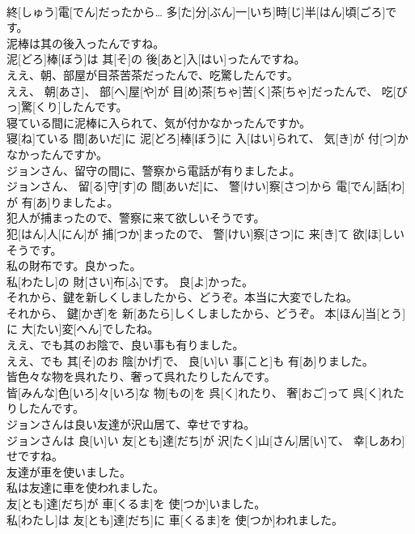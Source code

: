 \documentclass[8pt]{extreport}
\begin{document}
\begin{CJK}{UTF8}{min}
\\	終[しゅう]電[でん]だったから… 多[た]分[ぶん]一[いち]時[じ]半[はん]頃[ごろ]です。
\\	泥棒は其の後入ったんですね。	
\\	泥[どろ]棒[ぼう]は 其[そ]の 後[あと]入[はい]ったんですね。
\\	ええ、朝、部屋が目茶苦茶だったんで、吃驚したんです。	
\\	ええ、 朝[あさ]、 部[へ]屋[や]が 目[め]茶[ちゃ]苦[く]茶[ちゃ]だったんで、 吃[びっ]驚[くり]したんです。
\\	寝ている間に泥棒に入られて、気が付かなかったんですか。	
\\	寝[ね]ている 間[あいだ]に 泥[どろ]棒[ぼう]に 入[はい]られて、 気[き]が 付[つ]かなかったんですか。
\\	ジョンさん、留守の間に、警察から電話が有りましたよ。	
\\	ジョンさん、 留[る]守[す]の 間[あいだ]に、 警[けい]察[さつ]から 電[でん]話[わ]が 有[あ]りましたよ。
\\	犯人が捕まったので、警察に来て欲しいそうです。	
\\	犯[はん]人[にん]が 捕[つか]まったので、 警[けい]察[さつ]に 来[き]て 欲[ほ]しいそうです。
\\	私の財布です。良かった。	
\\	私[わたし]の 財[さい]布[ふ]です。 良[よ]かった。
\\	それから、鍵を新しくしましたから、どうぞ。本当に大変でしたね。	
\\	それから、 鍵[かぎ]を 新[あたら]しくしましたから、どうぞ。 本[ほん]当[とう]に 大[たい]変[へん]でしたね。
\\	ええ、でも其のお陰で、良い事も有りました。	
\\	ええ、でも 其[そ]のお 陰[かげ]で、 良[い]い 事[こと]も 有[あ]りました。
\\	皆色々な物を呉れたり、奢って呉れたりしたんです。	
\\	皆[みんな]色[いろ]々[いろ]な 物[もの]を 呉[く]れたり、 奢[おご]って 呉[く]れたりしたんです。
\\	ジョンさんは良い友達が沢山居て、幸せですね。	
\\	ジョンさんは 良[い]い 友[とも]達[だち]が 沢[たく]山[さん]居[い]て、 幸[しあわ]せですね。
\\	友達が車を使いました。 
\\	私は友達に車を使われました。	
\\	友[とも]達[だち]が 車[くるま]を 使[つか]いました。 
\\	私[わたし]は 友[とも]達[だち]に 車[くるま]を 使[つか]われました。

\end{CJK}
\end{document}
